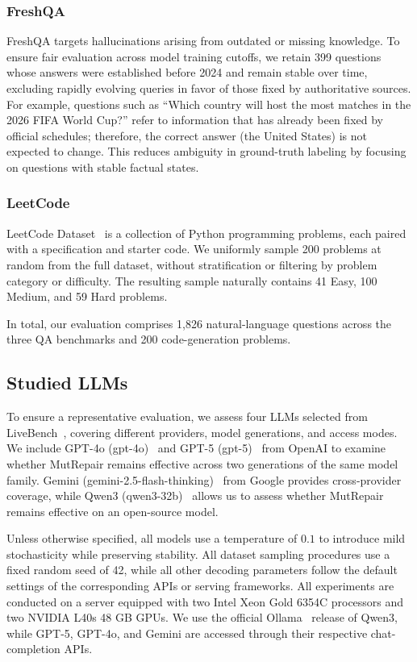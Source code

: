 \documentclass[acmsmall,screen,review,anonymous]{acmart}
\begin{document}
\subsubsection{FreshQA}
FreshQA targets hallucinations arising from outdated or missing knowledge. To ensure fair evaluation across model training cutoffs, we retain 399 questions whose answers were established before 2024 and remain stable over time, excluding rapidly evolving queries in favor of those fixed by authoritative sources. For example, questions such as ``Which country will host the most matches in the 2026 FIFA World Cup?'' refer to information that has already been fixed by official schedules; therefore, the correct answer (the United States) is not expected to change. This reduces ambiguity in ground-truth labeling by focusing on questions with stable factual states.

\subsubsection{LeetCode}
LeetCode Dataset~\cite{xia2025leetcodedataset} is a collection of Python programming problems, each paired with a specification and starter code. We uniformly sample 200 problems at random from the full dataset, without stratification or filtering by problem category or difficulty. The resulting sample naturally contains 41 Easy, 100 Medium, and 59 Hard problems.

In total, our evaluation comprises 1,826 natural-language questions across the three QA benchmarks and 200 code-generation problems.

\subsection{Studied LLMs}

To ensure a representative evaluation, we assess four LLMs selected from LiveBench~\cite{white2025livebench}, covering different providers, model generations, and access modes. We include GPT-4o (gpt-4o)~\cite{hurst2024gpt} and GPT-5 (gpt-5)~\cite{singh2025openai} from OpenAI to examine whether MutRepair remains effective across two generations of the same model family. Gemini (gemini-2.5-flash-thinking)~\cite{comanici2025gemini} from Google provides cross-provider coverage, while Qwen3 (qwen3-32b)~\cite{yang2025qwen3} allows us to assess whether MutRepair remains effective on an open-source model.

Unless otherwise specified, all models use a temperature of $0.1$ to introduce mild stochasticity while preserving stability. All dataset sampling procedures use a fixed random seed of 42, while all other decoding parameters follow the default settings of the corresponding APIs or serving frameworks. All experiments are conducted on a server equipped with two Intel Xeon Gold 6354C processors and two NVIDIA L40s 48 GB GPUs. We use the official Ollama~\cite{ollama2026} release of Qwen3, while GPT-5, GPT-4o, and Gemini are accessed through their respective chat-completion APIs.
\end{document}
